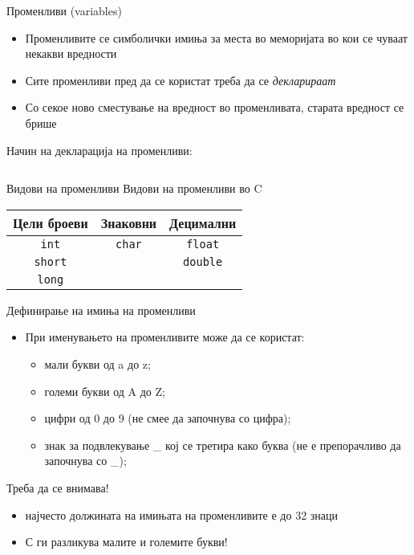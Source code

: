 \begin{frame}{Променливи (variables)}
\begin{itemize}
\item Променливите се симболички имиња за места во меморијата во кои се чуваат некакви вредности
\item Сите променливи пред да се користат треба да се \emph{декларираат}
\item Со секое ново сместување на вредност во променливата, старата вредност се брише
\end{itemize}

Начин на декларација на променливи:
\linebreak
\begin{columns}
		 
		 
		 \fbox{ = }
		 
		 \fbox{ ; }
\end{columns}	

\end{frame}

\begin{frame}{Видови на променливи}
\Large{Видови на променливи во C}
\linebreak
\linebreak
\begin{tabular}{c|c|c}
\textbf{Цели броеви} & \textbf{Знаковни} & \textbf{Децимални}\\
\hline
\texttt{int} & \texttt{char} & \texttt{float} \\
\hline
\texttt{short} & & \texttt{double} \\
\hline
\texttt{long} & &
\end{tabular}
\end{frame}

\begin{frame}{Дефинирање на имиња на променливи}
\begin{itemize}
\item При именувањето на променливите може да се користат:
\begin{itemize}
\item мали букви од a до z;
\item големи букви од A до Z;
\item цифри од 0 до 9 (не смее да започнува со цифра);
\item знак за подвлекување \_ кој се третира како буква (не е препорачливо да започнува со \_);
\end{itemize}
\end{itemize}
\begin{alertblock}{Треба да се внимава!}
\begin{itemize}
\item најчесто должината на имињата на променливите е до 32 знаци
\item С ги разликува малите и големите букви!
\end{itemize}
\end{alertblock}
\end{frame}


